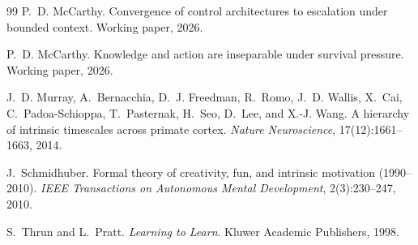 \documentclass[11pt]{article}
\theoremstyle{definition}
\begin{document}
\begin{thebibliography}{99}
P.~D. McCarthy.
\newblock Convergence of control architectures to escalation under bounded context.
\newblock Working paper, 2026.

P.~D. McCarthy.
\newblock Knowledge and action are inseparable under survival pressure.
\newblock Working paper, 2026.

J.~D. Murray, A.~Bernacchia, D.~J. Freedman, R.~Romo, J.~D. Wallis,
  X.~Cai, C.~Padoa-Schioppa, T.~Pasternak, H.~Seo, D.~Lee, and
  X.-J. Wang.
\newblock A hierarchy of intrinsic timescales across primate cortex.
\newblock \emph{Nature Neuroscience}, 17(12):1661--1663, 2014.

J.~Schmidhuber.
\newblock Formal theory of creativity, fun, and intrinsic motivation
  (1990--2010).
\newblock \emph{IEEE Transactions on Autonomous Mental Development},
  2(3):230--247, 2010.

S.~Thrun and L.~Pratt.
\newblock \emph{Learning to Learn}.
\newblock Kluwer Academic Publishers, 1998.

\end{thebibliography}
\end{document}
